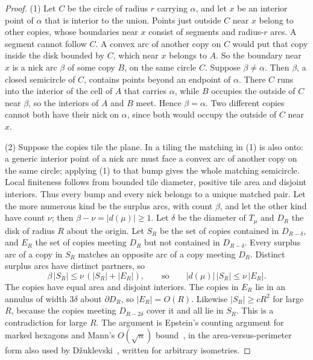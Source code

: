\documentclass[11pt]{amsart}
\theoremstyle{definition}
\theoremstyle{remark}
\begin{document}
\begin{proof}
(1) Let $C$ be the circle of radius $r$ carrying $\alpha$, and let $x$ be an interior point of $\alpha$ that is interior to the union. Points just outside $C$ near $x$ belong to other copies, whose boundaries near $x$ consist of segments and radius-$r$ arcs. A segment cannot follow $C$. A convex arc of another copy on $C$ would put that copy inside the disk bounded by $C$, which near $x$ belongs to $A$. So the boundary near $x$ is a nick arc $\beta$ of some copy $B$, on the same circle $C$. Suppose $\beta\ne\alpha$. Then $\beta$, a closed semicircle of $C$, contains points beyond an endpoint of $\alpha$. There $C$ runs into the interior of the cell of $A$ that carries $\alpha$, while $B$ occupies the outside of $C$ near $\beta$, so the interiors of $A$ and $B$ meet. Hence $\beta=\alpha$. Two different copies cannot both have their nick on $\alpha$, since both would occupy the outside of $C$ near $x$.

(2) Suppose the copies tile the plane. In a tiling the matching in (1) is also onto: a generic interior point of a nick arc must face a convex arc of another copy on the same circle; applying (1) to that bump gives the whole matching semicircle. Local finiteness follows from bounded tile diameter, positive tile area and disjoint interiors. Thus every bump and every nick belongs to a unique matched pair. Let the more numerous kind be the surplus arcs, with count $\beta$, and let the other kind have count $\nu$; then $\beta-\nu=|d(\mu)|\ge1$. Let $\delta$ be the diameter of $T_\mu$ and $D_R$ the disk of radius $R$ about the origin. Let $S_R$ be the set of copies contained in $D_{R-\delta}$, and $E_R$ the set of copies meeting $D_R$ but not contained in $D_{R-\delta}$. Every surplus arc of a copy in $S_R$ matches an opposite arc of a copy meeting $D_R$. Distinct surplus arcs have distinct partners, so
\[
\beta\,|S_R|\le \nu\,(|S_R|+|E_R|),\qquad\text{so}\qquad |d(\mu)|\,|S_R|\le \nu\,|E_R|.
\]
The copies have equal area and disjoint interiors. The copies in $E_R$ lie in an annulus of width $3\delta$ about $\partial D_R$, so $|E_R|=O(R)$. Likewise $|S_R|\ge cR^2$ for large $R$, because the copies meeting $D_{R-2\delta}$ cover it and all lie in $S_R$. This is a contradiction for large $R$. The argument is Epstein's counting argument for marked hexagons and Mann's $O(\sqrt n)$ bound~\cite{Mann2004}, in the area-versus-perimeter form also used by D\v{z}uklevski~\cite{Dzuklevski2026}, written for arbitrary isometries.


\end{proof}
\end{document}
